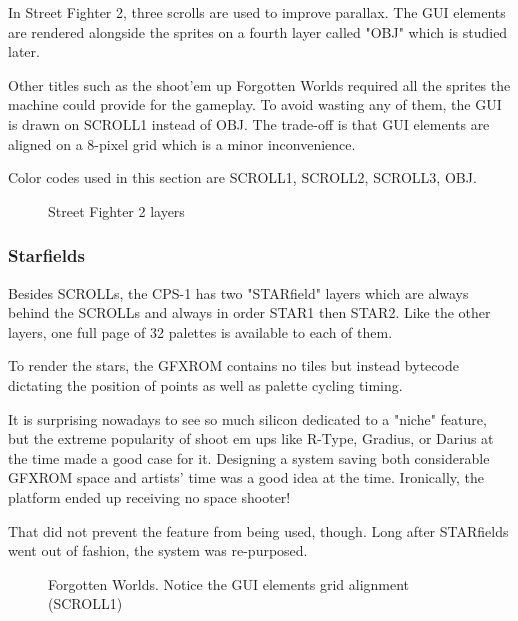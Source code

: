 In Street Fighter 2, three scrolls are used to improve parallax. The GUI elements are rendered alongside the sprites on a fourth layer called "OBJ" which is studied later.

Other titles such as the shoot'em up Forgotten Worlds required all the sprites the machine could provide for the gameplay. To avoid wasting any of them, the GUI is drawn on SCROLL1 instead of OBJ. The trade-off is that GUI elements are aligned on a 8-pixel grid which is a minor inconvenience.

Color codes used in this section are  SCROLL1,  SCROLL2,  SCROLL3,  OBJ.

\vfill
\begin{figure}[!b]
 \caption*{Street Fighter 2 layers}%
 \end{figure}%
\pagebreak


\subsubsection{Starfields}
Besides SCROLLs, the CPS-1 has two "STARfield" layers which are always behind the SCROLLs and always in order STAR1 then STAR2. Like the other layers, one full page of 32 palettes is available to each of them.

To render the stars, the GFXROM contains no tiles but instead bytecode dictating the position of points as well as palette cycling timing.

It is surprising nowadays to see so much silicon dedicated to a "niche" feature, but the extreme popularity of shoot
em ups like R-Type, Gradius, or Darius at the time made a good case for it. Designing a system saving both considerable GFXROM space and artists' time was a good idea at the time. Ironically, the platform ended up receiving no space shooter! 

That did not prevent the feature from being used, though. Long after STARfields went out of fashion, the system was re-purposed.




\vfill
\begin{figure}[!b]
 \caption*{Forgotten Worlds. Notice the GUI elements grid alignment (SCROLL1)}%
 \end{figure}%
\pagebreak

